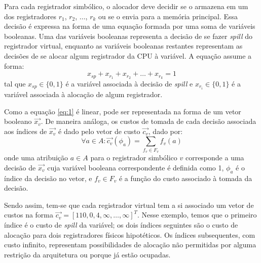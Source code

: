 \documentclass[
	12pt,				%
	openright,			%
	oneside,			%
	a4paper,			%
	tccpreliminar,			%
	]{ABNT-DC-UEL}
\begin{document}
Para cada registrador simbólico, o alocador deve decidir se o armazena em um dos registradores $r_1$, $r_2$, $\ldots$, $r_k$ ou se o envia para a memória principal. Essa decisão é expressa na forma de uma equação formada por uma soma de variáveis booleanas. Uma das variáveis booleanas representa a decisão de se fazer \textit{spill} do registrador virtual, enquanto as variáveis booleanas restantes representam as decisões de se alocar algum registrador da CPU à variável. A equação assume a forma:
\begin{equation}
    x_{sp} + x_{r_1} + x_{r_2} + \ldots + x_{r_k} = 1
    \label{eq:1}
\end{equation}
tal que $x_{sp}\in \{0,1\}$ é a variável associada à decisão de \textit{spill} e $x_{r_i}\in \{0,1\}$ é a variável associada à alocação de algum registrador.

Como a equação \ref{eq:1} é linear, pode ser representada na forma de um vetor booleano $\Vec{x_v}$. De maneira análoga, os custos de tomada de cada decisão associada aos índices de $\Vec{x_v}$ é dado pelo vetor de custo $\Vec{c_v}$, dado por:
\begin{equation}
    \forall a \in A : \Vec{c_v}({\phi}_a)=\sum_{f_v \in F_v}f_v(a)
    \label{eq:2}
\end{equation}
onde uma atribuição $a \in A$ para o registrador simbólico $v$ corresponde a uma decisão de $\Vec{x_v}$ cuja variável booleana correspondente é definida como 1, $\phi_a$ é o índice da decisão no vetor, e $f_v \in F_v$ é a função do custo associado à tomada da decisão.

Sendo assim, tem-se que cada registrador virtual tem a si associado um vetor de custos na forma $\Vec{c_v} = [110, 0, 4, \infty, \ldots, \infty]^T$. Nesse exemplo, temos que o primeiro índice é o custo de \textit{spill} da variável; os dois índices seguintes são o custo de alocação para dois registradores físicos hipotéticos. Os índices subsequentes, com custo infinito, representam possibilidades de alocação não permitidas por alguma restrição da arquitetura ou porque já estão ocupadas.
\end{document}

